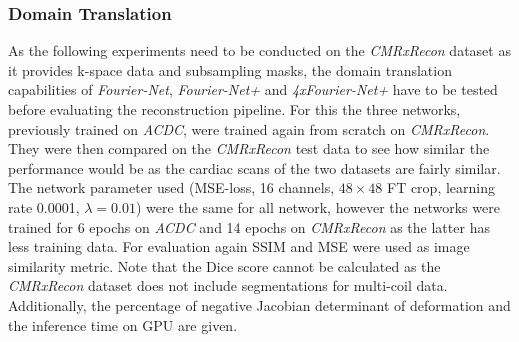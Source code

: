 \subsubsection{Domain Translation} \label{SubSubSec:DomainTranslation}
As the following experiments need to be conducted on the \emph{CMRxRecon} dataset as it provides k-space data and subsampling masks, the domain translation capabilities of \emph{Fourier-Net}, \emph{Fourier-Net+} and \emph{4xFourier-Net+} have to be tested before evaluating the reconstruction pipeline. For this the three networks, previously trained on \emph{ACDC}, were trained again from scratch on \emph{CMRxRecon}. They were then compared on the \emph{CMRxRecon} test data to see how similar the performance would be as the cardiac scans of the two datasets are fairly similar. The network parameter used (MSE-loss, 16 channels, $48 \times 48$ FT crop, learning rate 0.0001, $\lambda=0.01$) were the same for all network, however the networks were trained for 6 epochs on \emph{ACDC} and 14 epochs on \emph{CMRxRecon} as the latter has less training data. For evaluation again SSIM and MSE were used as image similarity metric. Note that the Dice score cannot be calculated as the \emph{CMRxRecon} dataset does not include segmentations for multi-coil data. Additionally, the percentage of negative Jacobian determinant of deformation and the inference time on GPU are given.


